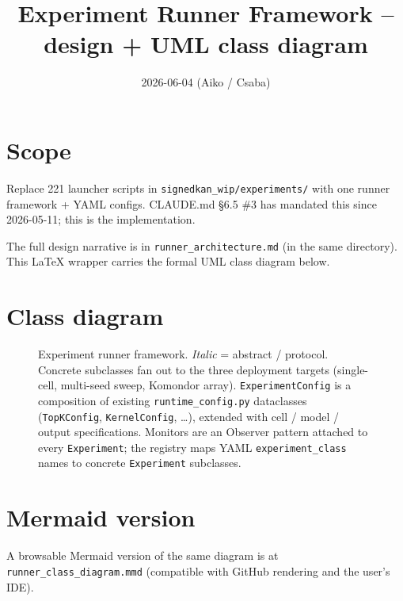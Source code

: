 \documentclass[11pt,a4paper]{article}
\title{Experiment Runner Framework -- design + UML class diagram}
\author{2026-06-04 (Aiko / Csaba)}
\date{}
\begin{document}
\maketitle

\section*{Scope}
Replace 221 launcher scripts in \texttt{signedkan\_wip/experiments/}
with one runner framework + YAML configs. CLAUDE.md \S6.5 \#3 has
mandated this since 2026-05-11; this is the implementation.

The full design narrative is in
\texttt{runner\_architecture.md} (in the same directory).
This LaTeX wrapper carries the formal UML class diagram below.

\section*{Class diagram}
\begin{figure}[h]
  \centering
  
  \caption{Experiment runner framework. \textit{Italic} = abstract /
    protocol. Concrete subclasses fan out to the three deployment
    targets (single-cell, multi-seed sweep, Komondor array).
    \texttt{ExperimentConfig} is a composition of existing
    \texttt{runtime\_config.py} dataclasses
    (\texttt{TopKConfig}, \texttt{KernelConfig}, \dots), extended
    with cell / model / output specifications. Monitors are an
    Observer pattern attached to every \texttt{Experiment}; the
    registry maps YAML \texttt{experiment\_class} names to concrete
    \texttt{Experiment} subclasses.}
\end{figure}

\section*{Mermaid version}
A browsable Mermaid version of the same diagram is at
\texttt{runner\_class\_diagram.mmd} (compatible with GitHub
rendering and the user's IDE).
\end{document}
